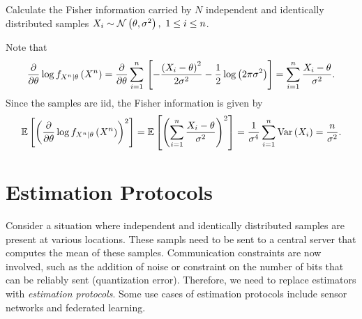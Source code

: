 \documentclass[twoside]{article}
\begin{document}
\begin{example}
  Calculate the Fisher information carried by \(N\) independent and identically
  distributed samples \(X_i \sim \mathcal N\left(\theta, \sigma^2\right),\ 1 \le i \le n\).
\end{example}

\begin{solution}
  Note that
  \begin{equation}
    \frac{\partial}{\partial \theta}\log{f_{X^n|\theta}\ensuremath{\left(X^n\right)}} = \frac{\partial}{\partial \theta}\sum_{i=1}^n{}\left[-\frac{\left(X_i-\theta\right)^2}{2\sigma^2} - \frac{1}{2}\log\left(2\pi\sigma^2\right)\right] = \sum_{i=1}^n\frac{X_i-\theta}{\sigma^2}.
  \end{equation}
  Since the samples are iid, the Fisher information is given by
  \begin{equation}
    \mathbb{E}\left[ \left(\frac{\partial}{\partial \theta}\log{f_{X^n|\theta}\ensuremath{\left(X^n\right)}}\right)^2 \right] = \mathbb{E}\left[ \left(\sum_{i=1}^n\frac{X_i-\theta}{\sigma^2}\right)^2 \right] = \frac{1}{\sigma^4}\sum_{i=1}^n\mathrm{Var}\left(X_i\right) = \frac{n}{\sigma^2}.
  \end{equation}
\end{solution}

\section{Estimation Protocols}

Consider a situation where independent and identically distributed samples are
present at various locations. These sampls need to be sent to a central server
that computes the mean of these samples. Communication constraints are now
involved, such as the addition of noise or constraint on the number of bits that
can be reliably sent (quantization error). Therefore, we need to replace
estimators with \emph{estimation protocols}. Some use cases of estimation
protocols include sensor networks and federated learning.
\end{document}
